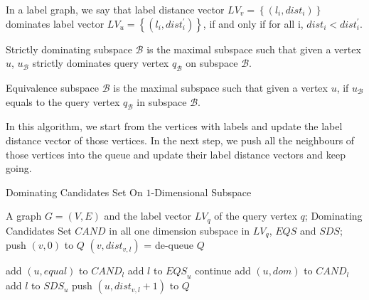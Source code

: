 \begin{definition}
In a label graph, we say that label distance vector $LV_v=\left\{(l_i, dist_i)\right\}$ dominates label vector $LV_u=\left\{(l_i, dist_i^\prime)\right\}$, if and only if for all i, $dist_i < dist_i^\prime$.
\end{definition}

\begin{definition}
Strictly dominating subspace $\mathcal{B}$ is the maximal subspace such that given a vertex $u$, $u_\mathcal{B}$ strictly dominates query vertex $q_\mathcal{B}$ on subspace $\mathcal{B}$.
\end{definition}

\begin{definition}
Equivalence subspace $\mathcal{B}$ is the maximal subspace such that given a vertex $u$, if $u_\mathcal{B}$ equals to the query vertex $q_\mathcal{B}$ in subspace $\mathcal{B}$.
\end{definition}

In this algorithm, we start from the vertices with labels and update the label distance vector of those vertices. In the next step, we push all the neighbours of those vertices into the queue and update their label distance vectors and keep going.  

\begin{algorithm}[h]
  \caption{Dominating Candidates Set On $1$-Dimensional Subspace}\label{algo:blah}
  \begin{algorithmic}[1]
  \show\LOOP
    \REQUIRE A graph $G=(V,E)$ and the label vector $LV_q$ of the query vertex $q$;
    \ENSURE Dominating Candidates Set $\mathit{CAND}$ in all one dimension subspace in $LV_q$, $\mathit{EQS}$ and $\mathit{SDS}$;
            \STATE push $\left(v, 0\right)$ to $Q$
        \ENDFOR
            \STATE $\left(v, dist_{v,l}\right)$ = de-queue $Q$
            
                \STATE add $\left(u, equal\right)$ to $\mathit{CAND}_l$
                \STATE add $l$ to $\mathit{EQS}_u$
                \STATE continue
            \ENDIF
            \STATE add $\left(u, dom\right)$ to $\mathit{CAND}_l$
            \STATE add $l$ to $\mathit{SDS}_u$
                \STATE push $\left(u, dist_{v,l}+1\right)$ to $Q$
            \ENDFOR
        \ENDWHILE
    \ENDFOR
  \end{algorithmic}
\end{algorithm}

